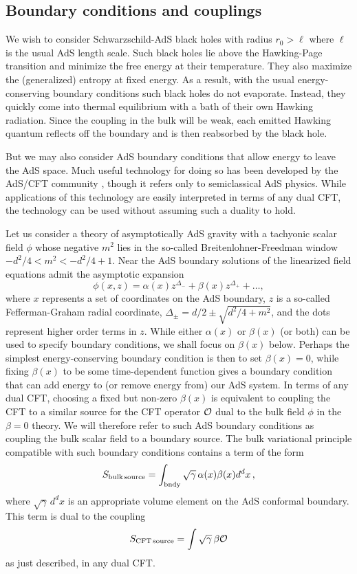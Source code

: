 \documentclass[12pt]{article}
\newcommand{\be}{\begin{equation}}
\newcommand{\ee}{\end{equation}}
\begin{document}
{\subsection{Boundary conditions and couplings}
\label{AdSAMPS}

We wish to consider Schwarzschild-AdS black holes with radius $r_0 > \ell$ where $\ell$ is the usual AdS length scale.  Such black holes lie above the Hawking-Page transition and minimize the free energy at their temperature.  They also maximize the (generalized) entropy at fixed energy.  As a result, with the usual energy-conserving boundary conditions such black holes do not evaporate.  Instead, they quickly come into thermal equilibrium with a bath of their own Hawking radiation.  Since the coupling in the bulk will be weak,  each emitted Hawking quantum reflects off the boundary and is then reabsorbed by the black hole.

But we may also consider AdS boundary conditions that allow energy to leave the AdS space.  Much useful technology for doing so has been developed by the AdS/CFT community \cite{Witten:2001ua,Berkooz:2002ug,Gubser:2002vv}, though it refers only to semiclassical AdS physics.  While applications of this technology are easily interpreted in terms of any dual CFT, the technology can be used without assuming such a duality to hold.

Let us consider a theory of asymptotically AdS gravity with a tachyonic scalar field $\phi$ whose negative $m^2$ lies in the so-called Breitenlohner-Freedman window
$-d^2/4 < m^2 < -d^2/4 +1$.  Near the AdS boundary solutions of the linearized field equations admit the asymptotic expansion
\begin{equation}
\phi (x,z) = \alpha(x) z^{\Delta_-} +  \beta(x) z^{\Delta_+} + \dots,
\end{equation}
where $x$ represents a set of coordinates on the AdS boundary, $z$ is a so-called Fefferman-Graham radial coordinate, $\Delta_\pm = d/2 \pm \sqrt{d^2/4 + m^2}$, and the dots represent higher order terms in $z$. While either $\alpha(x)$ or $\beta(x)$ (or both) can be used to specify boundary conditions, we shall focus on $\beta(x)$ below.  Perhaps the simplest energy-conserving boundary condition is then to set $\beta(x) =0$, while fixing $\beta(x)$ to be some time-dependent function gives a boundary condition that can add energy to (or remove energy from) our AdS system.  In terms of any dual CFT, choosing a fixed but non-zero $\beta(x)$ is equivalent to coupling the CFT to a similar source for the CFT operator ${\cal O}$ dual to the bulk field $\phi$ in the $\beta=0$ theory.  We will therefore refer to such AdS boundary conditions as coupling the bulk scalar field to a boundary source.  The bulk variational principle compatible with such boundary conditions contains a term of the form
\be
S_{\rm bulk \, source} = \int_{\rm bndy} \sqrt{\gamma} \,\alpha(x) \beta(x) d^dx\,,
\ee
where $\sqrt{\gamma}\, d^dx$ is an appropriate volume element on the AdS conformal boundary.  This term is dual to the coupling \be
S_{\rm CFT \, source} = \int \sqrt{\gamma}\, \beta {\cal O}
\ee
 as just described, in any dual CFT.

}
\end{document}
